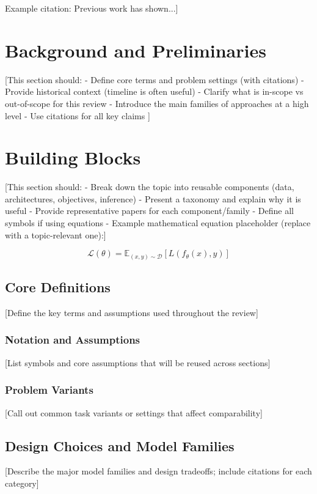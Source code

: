 \documentclass[conference]{IEEEtran}
\begin{document}
Example citation: Previous work \cite{author2023paper} has shown...]

\section{Background and Preliminaries}
[This section should:
- Define core terms and problem settings (with citations)
- Provide historical context (timeline is often useful)
- Clarify what is in-scope vs out-of-scope for this review
- Introduce the main families of approaches at a high level
- Use citations for all key claims \cite{smith2022deep}]

\section{Building Blocks}
[This section should:
- Break down the topic into reusable components (data, architectures, objectives, inference)
- Present a taxonomy and explain why it is useful
- Provide representative papers for each component/family
- Define all symbols if using equations
- Example mathematical equation placeholder (replace with a topic-relevant one):]

\begin{equation}
    \mathcal{L}(\theta) = \mathbb{E}_{(x,y) \sim \mathcal{D}} [L(f_\theta(x), y)]
\end{equation}

\subsection{Core Definitions}
[Define the key terms and assumptions used throughout the review]

\subsubsection{Notation and Assumptions}
[List symbols and core assumptions that will be reused across sections]

\subsubsection{Problem Variants}
[Call out common task variants or settings that affect comparability]

\subsection{Design Choices and Model Families}
[Describe the major model families and design tradeoffs; include citations for each category]
\end{document}
